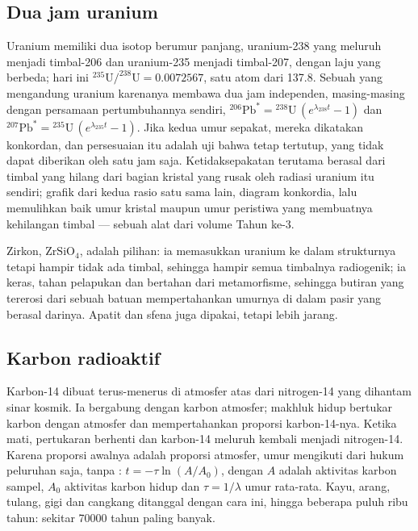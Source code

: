 \subsection*{Dua jam uranium}

Uranium memiliki dua isotop berumur panjang, uranium-238 yang meluruh menjadi timbal-206 dan uranium-235 menjadi timbal-207, dengan laju yang berbeda; hari ini $^{235}\mathrm{U}/^{238}\mathrm{U} = 0.0072567$, satu atom dari 137.8. Sebuah  yang mengandung uranium karenanya membawa dua jam independen, masing-masing dengan persamaan pertumbuhannya sendiri, ${}^{206}\mathrm{Pb}^* = {}^{238}\mathrm{U}\,(e^{\lambda_{238} t} - 1)$ dan ${}^{207}\mathrm{Pb}^* = {}^{235}\mathrm{U}\,(e^{\lambda_{235} t} - 1)$. Jika kedua umur sepakat, mereka dikatakan konkordan, dan persesuaian itu adalah uji bahwa  tetap tertutup, yang tidak dapat diberikan oleh satu jam saja. Ketidaksepakatan terutama berasal dari timbal yang hilang dari bagian kristal yang rusak oleh radiasi uranium itu sendiri; grafik dari kedua rasio satu sama lain, diagram konkordia, lalu memulihkan baik umur kristal maupun umur peristiwa yang membuatnya kehilangan timbal --- sebuah alat dari volume Tahun ke-3.

Zirkon, $\mathrm{ZrSiO_4}$, adalah  pilihan: ia memasukkan uranium ke dalam strukturnya tetapi hampir tidak ada timbal, sehingga hampir semua timbalnya radiogenik; ia keras, tahan pelapukan dan bertahan dari metamorfisme, sehingga butiran yang tererosi dari sebuah batuan mempertahankan umurnya di dalam pasir yang berasal darinya. Apatit dan sfena juga dipakai, tetapi lebih jarang.

\subsection*{Karbon radioaktif}

Karbon-14 dibuat terus-menerus di atmosfer atas dari nitrogen-14 yang dihantam sinar kosmik. Ia bergabung dengan karbon atmosfer; makhluk hidup bertukar karbon dengan atmosfer dan mempertahankan proporsi karbon-14-nya. Ketika mati, pertukaran berhenti dan karbon-14 meluruh kembali menjadi nitrogen-14. Karena proporsi awalnya adalah proporsi atmosfer, umur mengikuti dari hukum peluruhan saja, tanpa : $t = -\tau \ln(A/A_0)$, dengan $A$ adalah aktivitas karbon sampel, $A_0$ aktivitas karbon hidup dan $\tau =
1/\lambda$ umur rata-rata. Kayu, arang, tulang, gigi dan cangkang ditanggal dengan cara ini, hingga beberapa puluh ribu tahun: sekitar \num{70000} tahun paling banyak.

